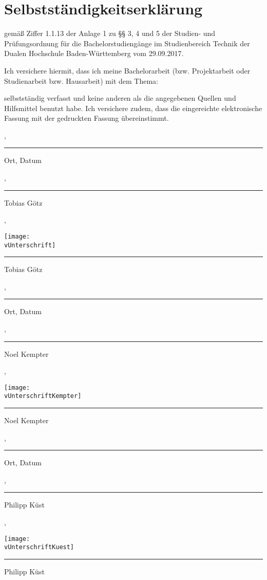 \thispagestyle{empty}
\section*{\Huge{Selbstständigkeitserklärung}}

gemäß Ziffer 1.1.13 der Anlage 1 zu §§ 3, 4 und 5  der Studien- und Prüfungsordnung für die Bachelorstudiengänge im Studienbereich Technik der Dualen Hochschule Baden-Würt­tem­berg vom 29.09.2017.

\noindent Ich versichere hiermit, dass ich meine Bachelorarbeit (bzw. Projektarbeit oder Studienarbeit bzw. Hausarbeit) mit dem Thema: 
\begin{center}
	\Large\textbf{\vTitel}
\end{center}
selbstständig verfasst und keine anderen als die angegebenen Quellen und Hilfsmittel benutzt habe. Ich versichere zudem, dass die eingereichte elektronische Fassung mit der gedruckten Fassung übereinstimmt.

\vfill
\leavevmode

\parbox{6cm}{\strut\centering \vBearbeitungsort, \vAbgabedatum\hrule\strut\centering\footnotesize Ort, Datum} 
\hfill
\ifx\vUnterschrift\empty
\parbox{6cm}{\strut\hspace{1pt} \vAbteilung, \hrule\strut\centering\footnotesize Tobias Götz}
\else
\parbox{6cm}{\strut\hspace{1pt} \vAbteilung, \parbox[b]{3cm}{\vspace{-10cm}\texttt{[image: \\vUnterschrift]}}\hrule\strut\centering\footnotesize Tobias Götz}
\fi
\vspace{1cm}

\parbox{6cm}{\strut\centering \vBearbeitungsort, \vAbgabedatum\hrule\strut\centering\footnotesize Ort, Datum}
\hfill
\ifx\vUnterschriftKempter\empty
\parbox{6cm}{\strut\hspace{1pt} \vAbteilung, \hrule\strut\centering\footnotesize Noel Kempter}
\else
\parbox{6cm}{\strut\hspace{1pt} \vAbteilung, \parbox[b]{3cm}{\vspace{-10cm}\texttt{[image: \\vUnterschriftKempter]}}\hrule\strut\centering\footnotesize Noel Kempter}
\fi
\vspace{1cm}

\parbox{6cm}{\strut\centering \vBearbeitungsort, \vAbgabedatum\hrule\strut\centering\footnotesize Ort, Datum}
\hfill
\ifx\vUnterschriftKuest\empty
\parbox{6cm}{\strut\hspace{1pt} \vAbteilung, \hrule\strut\centering\footnotesize Philipp Küst}
\else
\parbox{6cm}{\strut\hspace{1pt} \vAbteilung, \parbox[b]{3cm}{\vspace{-10cm}\texttt{[image: \\vUnterschriftKuest]}}\hrule\strut\centering\footnotesize Philipp Küst}
\fi
\vspace{1cm}

\newpage